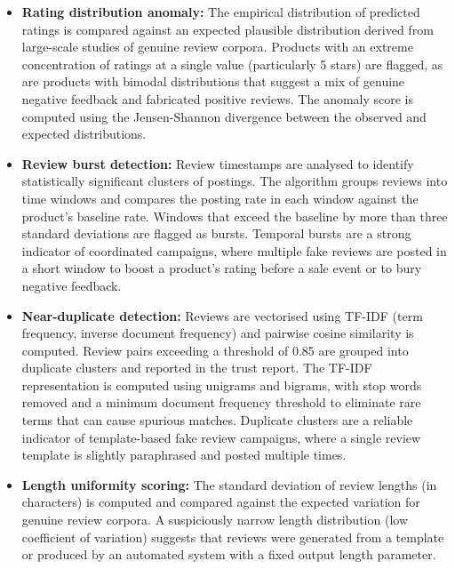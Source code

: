 \documentclass[12pt,a4paper,oneside]{report}
\begin{document}
\begin{itemize}[leftmargin=*]
  \item \textbf{Rating distribution anomaly:} The empirical distribution
        of predicted ratings is compared against an expected plausible
        distribution derived from large-scale studies of genuine review
        corpora. Products with an extreme concentration of ratings at a
        single value (particularly 5 stars) are flagged, as are products
        with bimodal distributions that suggest a mix of genuine negative
        feedback and fabricated positive reviews. The anomaly score is
        computed using the Jensen-Shannon divergence between the observed
        and expected distributions.

  \item \textbf{Review burst detection:} Review timestamps are analysed
        to identify statistically significant clusters of postings. The
        algorithm groups reviews into time windows and compares the
        posting rate in each window against the product's baseline rate.
        Windows that exceed the baseline by more than three standard
        deviations are flagged as bursts. Temporal bursts are a strong
        indicator of coordinated campaigns, where multiple fake reviews
        are posted in a short window to boost a product's rating before
        a sale event or to bury negative feedback.

  \item \textbf{Near-duplicate detection:} Reviews are vectorised using
        TF-IDF (term frequency, inverse document frequency) and pairwise
        cosine similarity is computed. Review pairs exceeding a threshold
        of 0.85 are grouped into duplicate clusters and reported in the
        trust report. The TF-IDF representation is computed using unigrams
        and bigrams, with stop words removed and a minimum document
        frequency threshold to eliminate rare terms that can cause
        spurious matches. Duplicate clusters are a reliable indicator of
        template-based fake review campaigns, where a single review
        template is slightly paraphrased and posted multiple times.

  \item \textbf{Length uniformity scoring:} The standard deviation of
        review lengths (in characters) is computed and compared against
        the expected variation for genuine review corpora. A suspiciously
        narrow length distribution (low coefficient of variation) suggests
        that reviews were generated from a template or produced by an
        automated system with a fixed output length parameter.


\end{itemize}
\end{document}
